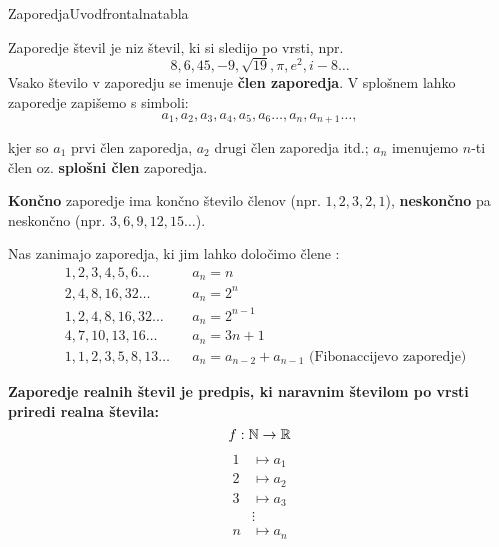 \begin{priprava}{}{}{Zaporedja}{Uvod}{frontalna}{tabla}



Zaporedje števil je niz števil, ki si sledijo po vrsti, npr. 
$$ 8, 6, 45, -9, \sqrt{19}, \pi, e^2, i-8 \ldots $$
Vsako število v zaporedju se imenuje \textbf{člen zaporedja}. V splošnem lahko zaporedje zapišemo s simboli:
$$ a_1, a_2, a_3, a_4, a_5, a_6 \ldots, a_n, a_{n+1} \ldots, $$

kjer so $ a_1 $ prvi člen zaporedja, $ a_2 $ drugi člen zaporedja itd.; $ a_n $ imenujemo $n$-ti člen oz. \textbf{splošni člen} zaporedja.

\textbf{Končno} zaporedje ima končno število členov (npr. $ 1, 2, 3, 2, 1 $), \textbf{neskončno} pa neskončno (npr. $ 3, 6, 9, 12, 15 \ldots $).

Nas zanimajo zaporedja, ki jim lahko določimo člene :
\begin{align*}
    & 1, 2, 3, 4, 5, 6 \ldots && a_n = n \\
    & 2, 4, 8, 16, 32 \ldots && a_n = 2^n \\
    & 1, 2, 4, 8, 16, 32 \ldots && a_n = 2^{n-1} \\
    & 4, 7, 10, 13, 16 \ldots && a_n = 3n + 1 \\
    & 1, 1, 2, 3, 5, 8, 13 \ldots && a_n = a_{n-2} + a_{n-1} \text{ (Fibonaccijevo zaporedje)}
\end{align*}

\textbf{Zaporedje realnih števil je predpis, ki naravnim številom po vrsti priredi realna števila:
$$ f: \mathbb{N} \rightarrow \mathbb{R} $$}
\begin{equation*}
    \begin{split}
        1 & \longmapsto a_1 \\
        2 & \longmapsto a_2 \\
        3 & \longmapsto a_3 \\
        & \vdots \\
        n & \longmapsto a_n \\
    \end{split}
\end{equation*}


\end{priprava}
